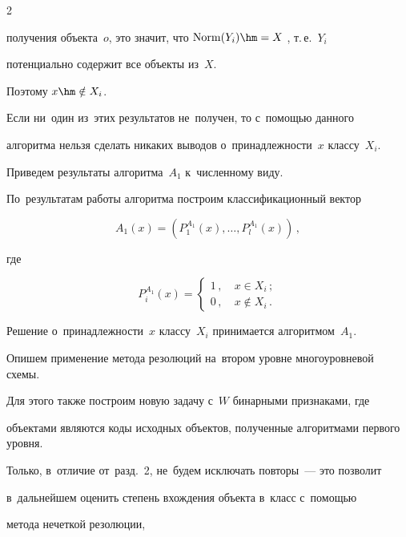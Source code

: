 \begin{multicols}{2}
\begin{enumerate}[1.]
получения объекта~$o$, это значит, что $ \mathrm{Norm}(Y_{i})\hm=X $ , т.\,е.~$Y_{i}$ 


потенциально содержит все объекты из~$X$.


Поэтому $x \hm\notin X_{i}$.


\end{enumerate}





Если ни~один из~этих результатов не~получен, то с~по\-мощью данного 


алгоритма нельзя сделать никаких выводов о~принадлежности~$x$ классу~$X_{i}$.





Приведем результаты алгоритма~$A_{1}$ к~численному виду.


По~результатам работы алгоритма построим классификационный вектор


$$


A_{1}(x)=\left(P_{1}^{A_{1}}(x),\ldots,P_{l}^{A_{1}}(x)\right) \,,


$$


где 


$$


P_{i}^{A_{1}}(x) = \begin{cases}


1\,, &\ x \in X_{i}\,; \\


0\,, &\ x \notin X_{i}\,.


\end{cases} 


$$





Решение о~принадлежности~$x$ классу~$X_{i}$ принимается алгоритмом~$A_{1}$.





Опишем применение метода резолюций на~втором уровне многоуровневой схемы.


Для этого также построим новую задачу с~$W$ бинарными признаками, где 


объектами являются коды исходных объектов, полученные алгоритмами первого уровня.


Только, в~отличие от~разд.~2, не~будем исключать повторы~--- это позволит 


в~дальнейшем оценить степень вхождения объекта в~класс с~по\-мощью 


метода нечеткой резолюции,



\end{multicols}
